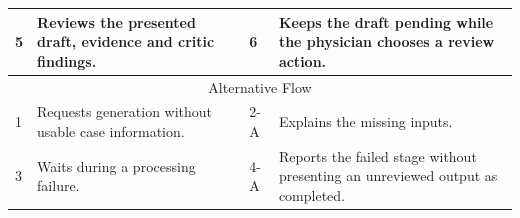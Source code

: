 \begin{reporttable}
\begin{tabular}{|p{}|p{}|p{}|p{}|p{}|}
5 & \multicolumn{2}{p{\dimexpr0.37\textwidth+2\tabcolsep+\arrayrulewidth\relax}|}{Reviews the presented draft, evidence and critic findings.} & 6 & Keeps the draft pending while the physician chooses a review action. \\ \hline
\multicolumn{5}{|c|}{Alternative Flow} \\ \hline
1 & \multicolumn{2}{p{\dimexpr0.37\textwidth+2\tabcolsep+\arrayrulewidth\relax}|}{Requests generation without usable case information.} & 2-A & Explains the missing inputs. \\ \hline
3 & \multicolumn{2}{p{\dimexpr0.37\textwidth+2\tabcolsep+\arrayrulewidth\relax}|}{Waits during a processing failure.} & 4-A & Reports the failed stage without presenting an unreviewed output as completed. \\ \hline
\end{tabular}
\end{reporttable}

